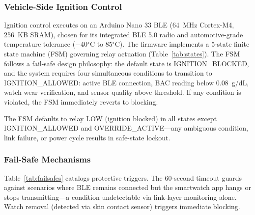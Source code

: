 \documentclass[HARVARD,Times2COL]{WileyNJDv5}
\begin{document}
\subsubsection{Vehicle-Side Ignition Control}
Ignition control executes on an Arduino Nano 33 BLE (64~MHz Cortex-M4, 256~KB SRAM), chosen for its integrated BLE 5.0 radio and automotive-grade temperature tolerance ($-$40$^\circ$C to 85$^\circ$C). The firmware implements a 5-state finite state machine (FSM) governing relay actuation (Table~\ref{tab:states}). The FSM follows a fail-safe design philosophy: the default state is IGNITION\_BLOCKED, and the system requires four simultaneous conditions to transition to IGNITION\_ALLOWED: active BLE connection, BAC reading below 0.08~g/dL, watch-wear verification, and sensor quality above threshold. If any condition is violated, the FSM immediately reverts to blocking.
\begin{table}[htbp]
\caption{Ignition Control State Machine}
\label{tab:states}
\centering
{}
\end{table}

The FSM defaults to relay LOW (ignition blocked) in all states except IGNITION\_ALLOWED and OVERRIDE\_ACTIVE---any ambiguous condition, link failure, or power cycle results in safe-state lockout.
\subsubsection{Fail-Safe Mechanisms}
Table~\ref{tab:failsafes} catalogs protective triggers. The 60-second timeout guards against scenarios where BLE remains connected but the smartwatch app hangs or stops transmitting---a condition undetectable via link-layer monitoring alone. Watch removal (detected via skin contact sensor) triggers immediate blocking.
\end{document}
